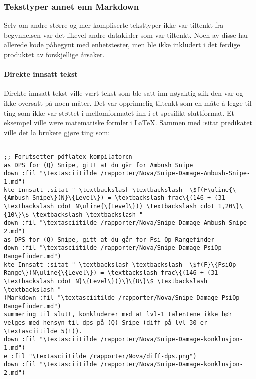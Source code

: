 \documentclass[11pt]{article}
\begin{document}
\subsubsection{Teksttyper annet enn Markdown}



Selv om andre større og mer kompliserte teksttyper ikke var tiltenkt fra begynnelsen var det likevel andre datakilder som var tiltenkt.
Noen av disse har allerede kode påbegynt med enhetstester, men ble ikke inkludert i det ferdige produktet av forskjellige årsaker.



\paragraph{Direkte innsatt tekst}
Direkte innsatt tekst ville vært tekst som ble satt inn nøyaktig slik den var og ikke oversatt på noen måter. Det var opprinnelig tiltenkt som en måte å legge til ting som ikke var støttet i mellomformatet inn i et spesifikt sluttformat. Et eksempel ville være matematiske formler i LaTeX.
Sammen med :sitat predikatet ville det la brukere gjøre ting som:




\begin{lstlisting}

;; Forutsetter pdflatex-kompilatoren
as DPS for (Q) Snipe, gitt at du går for Ambush Snipe
down :fil "\textasciitilde /rapporter/Nova/Snipe-Damage-Ambush-Snipe-1.md")
kte-Innsatt :sitat " \textbackslash \textbackslash  \$f(F\uline{\{Ambush-Snipe\}(N}\{Level\}) = \textbackslash frac\{(146 + (31 \textbackslash cdot N\uline{\{Level\})) \textbackslash cdot 1,20\}\{10\}\$ \textbackslash \textbackslash "
down :fil "\textasciitilde /rapporter/Nova/Snipe-Damage-Ambush-Snipe-2.md")
as DPS for (Q) Snipe, gitt at du går for Psi-Op Rangefinder
down :fil "\textasciitilde /rapporter/Nova/Snipe-Damage-PsiOp-Rangefinder.md")
kte-Innsatt :sitat " \textbackslash \textbackslash  \$f(F}\{PsiOp-Range\}(N\uline{\{Level\}) = \textbackslash frac\{(146 + (31 \textbackslash cdot N}\{Level\}))\}\{8\}\$ \textbackslash \textbackslash "
(Markdown :fil "\textasciitilde /rapporter/Nova/Snipe-Damage-PsiOp-Rangefinder.md")
summering til slutt, konkluderer med at lvl-1 talentene ikke bør velges med hensyn til dps på (Q) Snipe (diff på lvl 30 er \textasciitilde 5(!)).
down :fil "\textasciitilde /rapporter/Nova/Snipe-Damage-konklusjon-1.md")
e :fil "\textasciitilde /rapporter/Nova/diff-dps.png")
down :fil "\textasciitilde /rapporter/Nova/Snipe-Damage-konklusjon-2.md")
\end{lstlisting}
\end{document}
